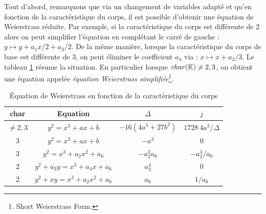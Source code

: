 Tout d'abord, remarquons que via un changement de variables adapté et qu'en fonction de la caractéristique du corps, il est possible d'obtenir une équation de Weierstrass réduite. Par exemple, si la caractéristique du corps \field{} est différente de $2$ alors on peut simplifier l'équation en complétant le carré de gauche : $y \mapsto y + a_1x/2 + a_3 /2$. De la même manière, lorsque la caractéristique du corps de base est différente de $3$, on peut éliminer le coefficient $a_4$ via : $x \mapsto x + a_2/3$. Le tableau \ref{tab:weierstrass} résume la situation. En particulier lorsque $char(\mathbb{K}{}) \neq 2, 3$, on obtient une équation appelée \emph{équation Weierstrass simplifiée}\footnote{Short Weierstrass Form.}.

\begin{table}[ht]
\centering
\begin{tabular}{|c|c|cc|}
\hline
char \field{} & Equation & $\Delta$ & $j$  \\
\hline \hline
\rule[0ex]{0pt}{3ex}
$\neq 2, 3$ & $y^2 = x^3 + ax + b$ & $-16(4a^3 + 27b^2)$ & $1728 \ 4 a^3 / \Delta$\\
3 & $y^2 = x^3 + ax + b$ & $-a^3$ & 0 \\
3 & $y^2 = x^3 + a_2x^2 + a_6$ & $-a_2^3a_6$ & $-a_2^3/a_6$\\
2 & $y^2 + a_3y = x^3 + a_4x + a_6$ & $a_3^4$ & $0$ \\
2 & $y^2 + xy = x^3 + a_2x^2 + a_6$ & $a_6$ & $1/a_6$\\
\hline
\end{tabular}
\caption{\'Equation de Weierstrass en fonction de la caractéristique du corps}
\label{tab:weierstrass}
\end{table}

